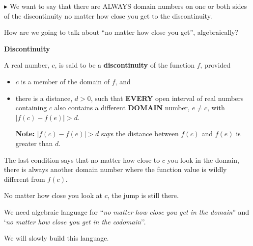 \documentclass{ximera}
\begin{document}
$\blacktriangleright$ We want to say that there are ALWAYS domain numbers on one or both sides of the discontinuity no matter how close you get to the discontinuity. 

How are we going to talk about ``no matter how close you get'', algebraically?





\begin{definition} \textbf{\textcolor{green!50!black}{Discontinuity}}  

A real number, $c$, is said to be a \textbf{discontinuity} of the function $f$, provided

\begin{itemize}
\item $c$ is a member of the domain of $f$, and


\item there is a distance, $d > 0$, such that \textbf{\textcolor{purple!85!blue}{EVERY}} open interval of real numbers containing $c$ also contains a different \textbf{\textcolor{purple!85!blue}{DOMAIN}} number, $e \ne c$, with $ |f(c) - f(e)| > d $.


\textbf{Note:}  $ |f(c) - f(e)| > d $ says the distance between $f(c)$ and $f(e)$ is greater than $d$.

\end{itemize}



\end{definition}




The last condition says that no matter how close to $c$ you look in the domain, there is always another domain number where the function value is wildly different from $f(c)$.

No matter how close you look at $c$, the jump is still there.


We need algebraic language for ``\textit{no matter how close you get in the domain}'' and `\textit{no matter how close you get in the codomain}''.


We will slowly build this language.
\end{document}
